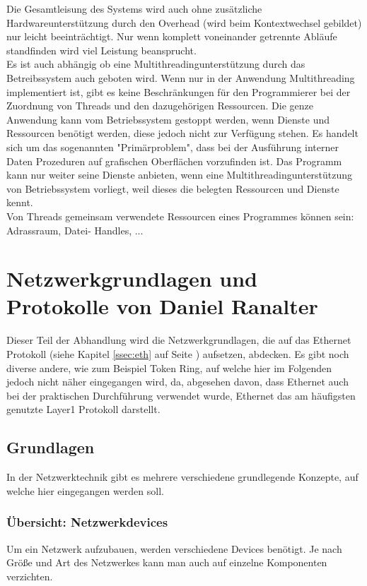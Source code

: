 \documentclass[12pt,a4paper]{report}
\begin{document}
\begin{onehalfspace}
Die Gesamtleisung des Systems wird auch ohne zusätzliche Hardwareunterstützung durch den Overhead (wird beim Kontextwechsel gebildet) nur leicht beeinträchtigt. Nur wenn komplett voneinander getrennte Abläufe standfinden wird viel Leistung beansprucht.\\

Es ist auch abhängig ob eine Multithreadingunterstützung durch das Betreibssystem auch geboten wird. Wenn nur in der Anwendung Multithreading implementiert ist, gibt es keine Beschränkungen für den Programmierer bei der Zuordnung von Threads und den dazugehörigen Ressourcen. Die genze Anwendung kann vom Betriebssystem gestoppt werden, wenn Dienste und Ressourcen benötigt werden, diese jedoch nicht zur Verfügung stehen. Es handelt sich um das sogenannten "{}Primärproblem"{}, dass bei der Ausführung interner Daten Prozeduren auf grafischen Oberflächen vorzufinden ist. Das Programm kann nur weiter seine Dienste anbieten, wenn eine Multithreadingunterstützung von Betriebssystem vorliegt, weil dieses die belegten Ressourcen und Dienste kennt.\\

Von Threads gemeinsam verwendete Ressourcen eines Programmes können sein: Adrassraum, Datei- Handles, 
...\\

\newpage
{}
\chapter{Netzwerkgrundlagen und Protokolle von Daniel Ranalter}
Dieser Teil der Abhandlung wird die Netzwerkgrundlagen, die auf das Ethernet Protokoll (siehe Kapitel \ref{ssec:eth} auf Seite \pageref{ssec:eth}) aufsetzen, abdecken. Es gibt noch diverse andere, wie zum Beispiel Token Ring, auf welche hier im Folgenden jedoch nicht näher eingegangen wird, da, abgesehen davon, dass Ethernet auch bei der praktischen Durchführung verwendet wurde, Ethernet das am häufigsten genutzte Layer1 Protokoll darstellt. 

\section{Grundlagen}
In der Netzwerktechnik gibt es mehrere verschiedene grundlegende Konzepte, auf welche hier eingegangen werden soll.

\subsection{Übersicht: Netzwerkdevices}
Um ein Netzwerk aufzubauen, werden verschiedene Devices benötigt. Je nach Größe und Art des Netzwerkes kann man auch auf einzelne Komponenten verzichten. 


\end{onehalfspace}
\end{document}
